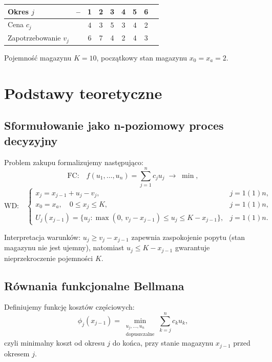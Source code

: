 \documentclass[12pt,a4paper]{article}
\begin{document}
\begin{center}
\begin{tabular}{lcccccccc}
\toprule
Okres $j$ & -- & 1 & 2 & 3 & 4 & 5 & 6 \\
\midrule
Cena $c_j$ & & 4 & 3 & 5 & 3 & 4 & 2 \\
Zapotrzebowanie $v_j$ & & 6 & 7 & 4 & 2 & 4 & 3 \\
\bottomrule
\end{tabular}
\end{center}

\noindent
Pojemno\'s\'c magazynu $K=10$, pocz\k{a}tkowy stan magazynu $x_0 = x_a = 2$.

\section{Podstawy teoretyczne}

\subsection{Sformu\l{}owanie jako n-poziomowy proces decyzyjny}

Problem zakupu formalizujemy nast\k{e}puj\k{a}co:
\begin{equation}\label{eq:fc}
    \text{FC:}\quad f(u_1,\ldots,u_n) = \sum_{j=1}^{n} c_j u_j \;\longrightarrow\; \min,
\end{equation}
\begin{equation}\label{eq:wd}
    \text{WD:}\quad
    \begin{cases}
        x_j = x_{j-1} + u_j - v_j, & j = 1(1)n, \\
        x_0 = x_a,\quad 0 \le x_j \le K, & j = 1(1)n, \\
        U_j(x_{j-1}) = \bigl\{u_j : \max(0,\,v_j - x_{j-1}) \le u_j \le K - x_{j-1}\bigr\}, & j = 1(1)n.
    \end{cases}
\end{equation}

Interpretacja warunk\'ow: $u_j \ge v_j - x_{j-1}$ zapewnia zaspokojenie popytu
(stan magazynu nie jest ujemny), natomiast $u_j \le K - x_{j-1}$ gwarantuje
nieprzekroczenie pojemno\'sci $K$.

\subsection{R\'ownania funkcjonalne Bellmana}

Definiujemy funkcj\k{e} koszt\'ow cz\k{e}\'sciowych:
\begin{equation}\label{eq:bell_def}
    \phi_j(x_{j-1}) = \min_{\substack{u_j,\ldots,u_n \\ \text{dopuszczalne}}}
        \sum_{k=j}^{n} c_k u_k,
\end{equation}
czyli minimalny koszt od okresu $j$ do ko\'nca, przy stanie magazynu
$x_{j-1}$ przed okresem $j$.
\end{document}
